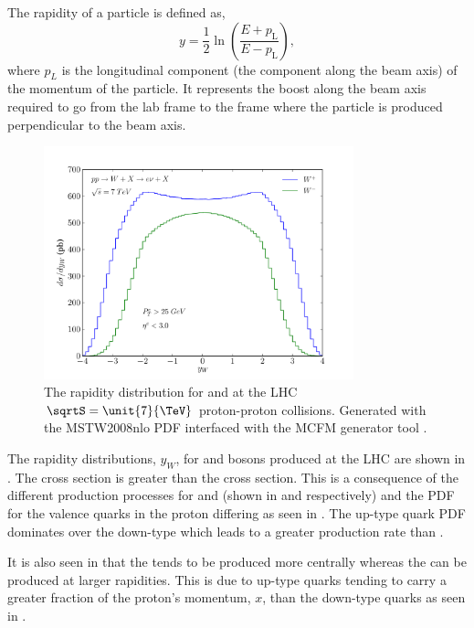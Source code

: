 The rapidity of a particle is defined as,
\begin{equation}
    y = \frac{1}{2} \ln \left(\frac{E+p_\text{L}}{E-p_\text{L}}\right),
\end{equation}
where $p_{L}$ is the longitudinal component (the component along the beam axis)
of the momentum of the particle. It represents the boost along the beam axis
required to go from the lab frame to the frame where the particle is produced
perpendicular to the beam axis.
\begin{figure}[htbp]
  \centering
  \includegraphics[width=0.8\textwidth]{w-rapidity}
  \caption[The rapidity distribution for \PWp and \PWm at the LHC
$\sqrtS=\unit{7}{\TeV}$ proton-proton collisions.] {The rapidity distribution
for \PWp and \PWm at the LHC $\sqrtS=\unit{7}{\TeV}$ proton-proton collisions.
Generated with the MSTW2008nlo PDF\cite{martin2009parton} interfaced with the
MCFM generator tool \cite{campbellmcfm}.}
  \label{wbos:wrapid}
\end{figure}

The rapidity distributions, $y_W$, for \PWp and \PWm bosons produced at the
{LHC} are shown in .  The \PWp cross section is greater
than the \PWm cross section.  This is a consequence of the different production
processes for \PWp and \PWm (shown in  and
 respectively) and the {PDF} for the valence quarks in
the proton differing as seen in . The up-type quark
{PDF} dominates over the down-type which leads to a greater \PWp production rate
than \PWm.

It is also seen in  that the \PWm tends to be produced
more centrally whereas the \PWp can be produced at larger rapidities. This is due
to up-type quarks tending to carry a greater fraction of the proton's momentum,
$x$, than the down-type quarks as seen in .

